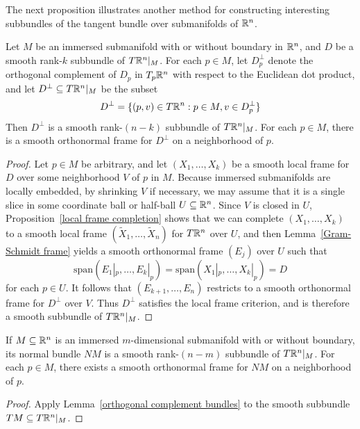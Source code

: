 The next proposition illustrates another method for constructing interesting subbundles of the tangent bundle over submanifolds of $\mathbb{R}^n$.
\begin{lemma}\label{orthogonal complement bundles}
Let $M$ be an immersed submanifold with or without boundary in $\mathbb{R}^n$, and $D$ be a smooth rank-$k$ subbundle of $T\mathbb{R}^n|_M$. For each $p\in M$, let $D^\bot_p$ denote the orthogonal complement of $D_p$ in $T_p\mathbb{R}^n$ with respect to the Euclidean dot product, and let $D^\bot\subseteq T\mathbb{R}^n|_M$ be the subset
\[D^\bot=\{(p,v)\in T\mathbb{R}^n:p\in M,v\in D^\bot_p\}\]
Then $D^\bot$ is a smooth rank-$(n-k)$ subbundle of $T\mathbb{R}^n|_M$. For each $p\in M$, there is a smooth orthonormal frame for $D^\bot$ on a neighborhood of $p$.
\end{lemma}
\begin{proof}
Let $p\in M$ be arbitrary, and let $(X_1,\dots,X_k)$ be a smooth local frame for $D$ over some neighborhood $V$ of $p$ in $M$. Because immersed submanifolds are locally 
embedded, by shrinking $V$ if necessary, we may assume that it is a single slice in some coordinate ball or half-ball $U\subseteq\mathbb{R}^n$. Since $V$ is closed in $U$, 
Proposition~\ref{local frame completion} shows that we can complete $(X_1,\dots,X_k)$ to a smooth local frame $(\widetilde{X}_1,\dots,\widetilde{X}_n)$ for $T\mathbb{R}^n$ 
over $U$, and then Lemma~\ref{Gram-Schmidt frame} yields a smooth orthonormal frame $(E_j)$ over $U$ such that 
\[\mathrm{span}(E_1|_p,\dots,E_k|_p)=\mathrm{span}(X_1|_p,\dots,X_k|_p)=D\]
for each $p\in U$. It follows that $(E_{k+1},\dots,E_n)$ restricts to a smooth orthonormal frame for $D^\bot$ over $V$. Thus $D^\bot$ satisfies the local frame 
criterion, and is therefore a smooth subbundle of $T\mathbb{R}^n|_M$.
\end{proof}
\begin{corollary}
If $M\subseteq\mathbb{R}^n$ is an immersed $m$-dimensional submanifold with or without boundary, its normal bundle $NM$ is a smooth rank-$(n-m)$ subbundle of $T\mathbb{R}^n|_M$. For each $p\in M$, there exists a smooth orthonormal frame for $NM$ on a neighborhood of $p$.
\end{corollary}
\begin{proof}
Apply Lemma~\ref{orthogonal complement bundles} to the smooth subbundle $TM\subseteq T\mathbb{R}^n|_M$.
\end{proof}
